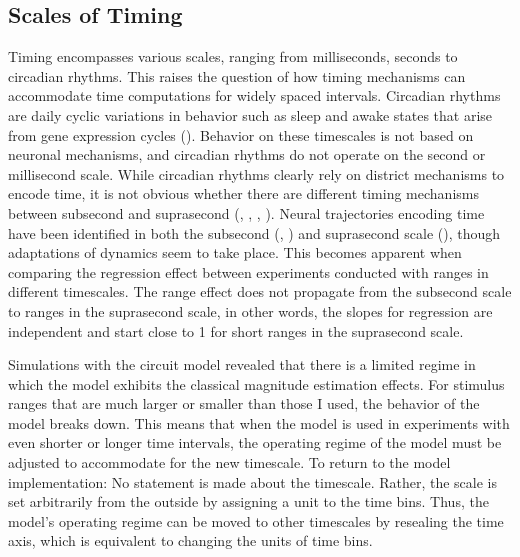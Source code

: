 \documentclass[10pt]{article}
\begin{document}
\subsection{Scales of Timing}
Timing encompasses various scales, ranging from milliseconds, seconds to circadian rhythms. This raises the question of how timing mechanisms can accommodate time computations for widely spaced intervals. 
Circadian rhythms are daily cyclic variations in behavior such as sleep and awake states that arise from gene expression cycles (\cite{Patke2020}). Behavior on these timescales is not based on neuronal mechanisms, and circadian rhythms do not operate on the second or millisecond scale. 
While circadian rhythms clearly rely on district mechanisms to encode time, it is not obvious whether there are different timing mechanisms between subsecond and suprasecond (\cite{Buonomano2002}, \cite{Buonomano2007}, \cite{Paton2018}, \cite{Tsao2022}). %
Neural trajectories encoding time have been identified in both the subsecond (\cite{Sohn2019}, \cite{Meirhaeghe2021}) and suprasecond scale (\cite{Henke2021}), though adaptations of dynamics seem to take place.
This becomes apparent when comparing the regression effect between experiments conducted with ranges in different timescales. 
The range effect does not propagate from the subsecond scale to ranges in the suprasecond scale, in other words, the slopes for regression are independent and start close to 1 for short ranges in the suprasecond scale. 

Simulations with the circuit model revealed that there is a limited regime in which the model exhibits the classical magnitude estimation effects. 
For stimulus ranges that are much larger or smaller than those I used, the behavior of the model breaks down.
This means that when the model is used in experiments with even shorter or longer time intervals, the operating regime of the model must be adjusted to accommodate for the new timescale.
To return to the model implementation: No statement is made about the timescale.  Rather, the scale is set arbitrarily from the outside by assigning a unit to the time bins. Thus, the model's operating regime can be moved to other timescales by resealing the time axis, which is equivalent to changing the units of time bins.
\end{document}

